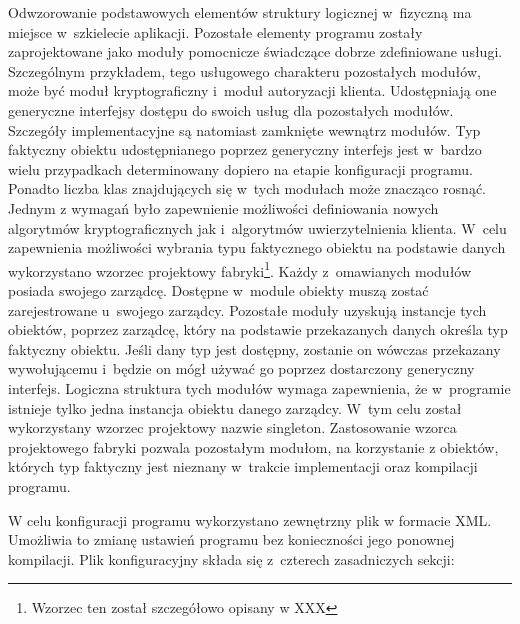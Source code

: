 
Odwzorowanie podstawowych elementów struktury logicznej w~fizyczną ma
miejsce w~szkielecie aplikacji. Pozostałe elementy programu zostały
zaprojektowane jako moduły pomocnicze świadczące dobrze zdefiniowane
usługi. Szczególnym przykładem, tego usługowego charakteru pozostałych
modułów, może być moduł kryptograficzny i~moduł autoryzacji
klienta. Udostępniają one generyczne interfejsy dostępu do swoich
usług dla pozostałych modułów. Szczegóły implementacyjne są natomiast
zamknięte wewnątrz modułów. Typ faktyczny obiektu udostępnianego
poprzez generyczny interfejs jest w~bardzo wielu przypadkach
determinowany dopiero na etapie konfiguracji programu. Ponadto liczba
klas znajdujących się w~tych modułach może znacząco rosnąć. Jednym z
wymagań było zapewnienie możliwości definiowania nowych algorytmów
kryptograficznych jak i~algorytmów uwierzytelnienia klienta. W~celu
zapewnienia możliwości wybrania typu faktycznego obiektu na podstawie
danych wykorzystano wzorzec projektowy fabryki\footnote{Wzorzec ten
  został szczegółowo opisany w XXX}.  Każdy z~omawianych modułów
posiada swojego zarządcę. Dostępne w~module obiekty muszą zostać
zarejestrowane u~swojego zarządcy. Pozostałe moduły uzyskują instancje
tych obiektów, poprzez zarządcę, który na podstawie przekazanych
danych określa typ faktyczny obiektu. Jeśli dany typ jest dostępny,
zostanie on wówczas przekazany wywołującemu i~będzie on mógł używać go
poprzez dostarczony generyczny interfejs. Logiczna struktura tych
modułów wymaga zapewnienia, że w~programie istnieje tylko jedna
instancja obiektu danego zarządcy. W~tym celu został wykorzystany
wzorzec projektowy nazwie singleton. Zastosowanie wzorca projektowego
fabryki pozwala pozostałym modułom, na korzystanie z obiektów, których
typ faktyczny jest nieznany w~trakcie implementacji oraz kompilacji
programu.

W celu konfiguracji programu wykorzystano zewnętrzny plik w formacie
XML. Umożliwia to zmianę ustawień programu bez konieczności jego
ponownej kompilacji. Plik konfiguracyjny składa się z~czterech
zasadniczych sekcji:

